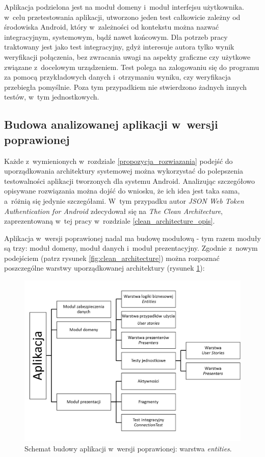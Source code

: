 Aplikacja podzielona jest na moduł domeny i~moduł interfejsu użytkownika. w~celu przetestowania aplikacji, utworzono jeden test całkowicie zależny od środowiska Android, który w~zależności od kontekstu można nazwać integracyjnym, systemowym, bądź nawet końcowym. Dla potrzeb pracy traktowany jest jako test integracyjny, gdyż interesuje autora tylko wynik weryfikacji połączenia, bez zwracania uwagi na aspekty graficzne czy użytkowe związane z~docelowym urządzeniem. Test polega na zalogowaniu się do programu za pomocą przykładowych danych i~otrzymaniu wyniku, czy weryfikacja przebiegła pomyślnie. Poza tym przypadkiem nie stwierdzono żadnych innych testów, w~tym jednostkowych.

\subsection{Budowa analizowanej aplikacji w~wersji poprawionej}
Każde z~wymienionych w~rozdziale \ref{propozycja_rozwiazania} podejść do uporządkowania architektury systemowej można wykorzystać do polepszenia testowalności aplikacji tworzonych dla systemu Android. Analizując szczegółowo opisywane rozwiązania można dojść do wniosku, że ich idea jest taka sama, a~różnią się jedynie szczegółami. W~tym przypadku autor \textit{JSON Web Token Authentication for Android} zdecydował się na \textit{The Clean Architecture}, zaprezentowaną w~tej pracy w~rozdziale \ref{clean_architecture_opis}.

Aplikacja w~wersji poprawionej nadal ma budowę modułową - tym razem moduły są trzy: moduł domeny, moduł danych i~moduł prezentacyjny. Zgodnie z~nowym podejściem (patrz rysunek \ref{fig:clean_architecture}) można rozpoznać poszczególne warstwy uporządkowanej architektury (rysunek \ref{fig:app_cl}):
\begin{figure}[!htb]
    \centering
    \includegraphics[width=12cm]{imgs/ch6_app_cl_diagram.png}
    \caption
{Schemat budowy aplikacji w~wersji poprawionej: warstwa \textit{entities}.}
    \label{fig:app_cl}
\end{figure} 

